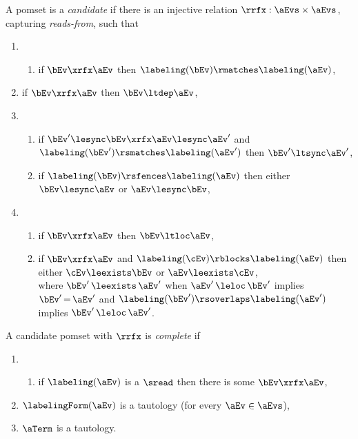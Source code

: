 \begin{definition}
  A pomset is a \emph{candidate} if there is an injective relation
  ${\rrfx} : \aEvs\times\aEvs$, capturing \emph{reads-from}, such that
  \begin{enumerate}[,label=(\textsc{c}\arabic*),ref=\textsc{c}\arabic*]
    \setcounter{enumi}{\value{lambda}}
  \item[] 
    \begin{enumerate}[leftmargin=0pt]
    \item \label{cand-rf}
      if $\bEv\xrfx\aEv$ then $\labeling(\bEv) \rmatches \labeling(\aEv)$,
    \end{enumerate}
    \setcounter{enumi}{\value{Bledep}}
  \item \label{cand-ledep-rf}
    if $\bEv\xrfx\aEv$ then $\bEv \ltdep \aEv$,
    \setcounter{enumi}{\value{lesync}}
  \item[] 
    \begin{enumerate}[leftmargin=0pt]
    \item \label{cand-lesync-rf}
      if $\bEv'\lesync\bEv\xrfx\aEv\lesync\aEv'$ and $\labeling(\bEv') \rsmatches \labeling(\aEv')$ then $\bEv' \ltsync \aEv'$,
    \item \label{cand-lesync-sc}
      if $\labeling(\bEv) \rsfences \labeling(\aEv)$ then either $\bEv\lesync\aEv$ or $\aEv\lesync\bEv$, 
    \end{enumerate}
    \setcounter{enumi}{\value{leloc}}
  \item[] 
    \begin{enumerate}[leftmargin=0pt]
    \item  \label{cand-leloc-rf}
      if $\bEv\xrfx\aEv$ then $\bEv \ltloc \aEv$,
    \item \label{cand-leloc-block}
      if $\bEv\xrfx\aEv$ and $\labeling(\cEv) \rblocks \labeling(\aEv)$ then either $\cEv\leexists\bEv$ or $\aEv\leexists\cEv$,\\
      where $\bEv'{\,\leexists\,}\aEv'$ when $\aEv'{\,\leloc\,}\bEv'$ implies $\bEv'{\,=\,}\aEv'$ and
      $\labeling(\bEv') \rsoverlaps \labeling(\aEv')$ implies $\bEv'{\,\leloc\,}\aEv'$.
    \end{enumerate}
  \end{enumerate}

  A candidate pomset with $\rrfx$ is \emph{complete} if
  \begin{enumerate}[,label=(\textsc{c}\arabic*),ref=\textsc{c}\arabic*]
    \setcounter{enumi}{\value{lambda}}
  \item[] 
    \begin{enumerate}[leftmargin=0pt]
    \item \label{top-rf}
      if $\labeling(\aEv)$ is a $\sread$ then there is some $\bEv\xrfx\aEv$,
    \end{enumerate}
    \setcounter{enumi}{\value{Bkappa}}
  \item \label{top-kappa}
    $\labelingForm(\aEv)$ is a tautology (for every $\aEv\in\aEvs$),
    \setcounter{enumi}{\value{Bterm}}
  \item \label{top-term}
    $\aTerm$ is a tautology.
  \end{enumerate}
\end{definition}

